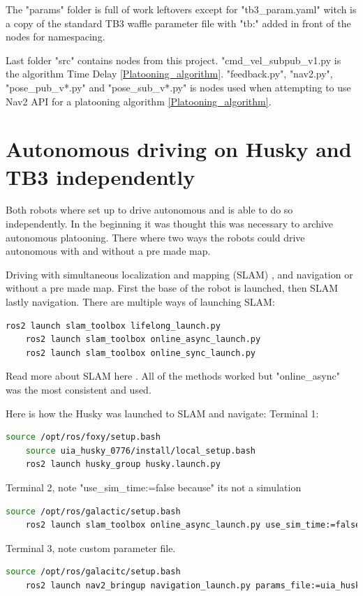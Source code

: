 The "params" folder is full of work leftovers except for "tb3\_param.yaml" witch is a copy of the standard TB3 waffle parameter file with "tb:" added in front of the nodes for namespacing.

Last folder "src" contains nodes from this project. "cmd\_vel\_subpub\_v1.py is the algorithm Time Delay \ref{Platooning_algorithm}. "feedback.py", "nav2.py", "pose\_pub\_v*.py" and "pose\_sub\_v*.py" is nodes used when attempting to use Nav2 API for a platooning algorithm \ref{Platooning_algorithm}.

\section{Autonomous driving on Husky and TB3 independently}
Both robots where set up to drive autonomous and is able to do so independently. In the beginning it was thought this was necessary to archive autonomous platooning. There where two ways the robots could drive autonomous with and without a pre made map. 

Driving with simultaneous localization and mapping (SLAM) , and navigation or without a pre made map. First the base of the robot is launched, then SLAM lastly navigation. There are multiple ways of launching SLAM: 
\begin{lstlisting}[language=bash]
    ros2 launch slam_toolbox lifelong_launch.py 
    ros2 launch slam_toolbox online_async_launch.py
    ros2 launch slam_toolbox online_sync_launch.py
\end{lstlisting}
Read more about SLAM here \cite{slamtoolboxgithub}. All of the methods worked but "online\_async" was the most consistent and used. 

Here is how the Husky was launched to SLAM and navigate: 
Terminal 1: 
\begin{lstlisting}[language=bash]
    source /opt/ros/foxy/setup.bash
    source uia_husky_0776/install/local_setup.bash
    ros2 launch husky_group husky.launch.py
\end{lstlisting}
Terminal 2, note "use\_sim\_time:=false because" its not a simulation 
\begin{lstlisting}[language=bash]
    source /opt/ros/galactic/setup.bash
    ros2 launch slam_toolbox online_async_launch.py use_sim_time:=false
\end{lstlisting}
Terminal 3, note custom parameter file. 
\begin{lstlisting}[language=bash]
    source /opt/ros/galacitc/setup.bash
    ros2 launch nav2_bringup navigation_launch.py params_file:=uia_husky_0776/husky_group/params/nav2_params.yaml
\end{lstlisting}

